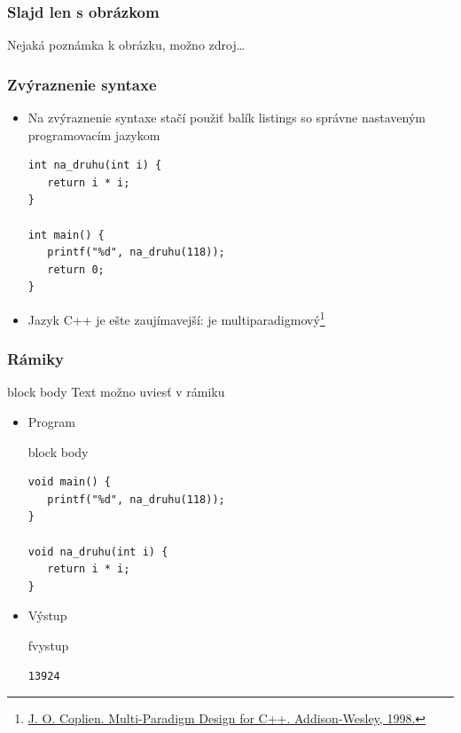 \documentclass{beamer}
\newcommand{\footcite}[1]{\footnote{\tiny #1}}
\newenvironment{program}{\begin{beamercolorbox}[rounded=true,shadow=true]{block body}\vspace{-4mm}}{\vspace{-2mm}\end{beamercolorbox}}
\newenvironment{vystup}{\begin{beamercolorbox}[rounded=true,shadow=true]{fvystup}}{\end{beamercolorbox}}
\newenvironment{poznamka}{\begin{beamercolorbox}[rounded=true,shadow=false]{block body}}{\end{beamercolorbox}}
\begin{document}
\begin{frame}[fragile=singleslide]\frametitle{Slajd len s obrázkom}

	{\tiny Nejaká poznámka k obrázku, možno zdroj\ldots}
\end{frame}


\begin{frame}[fragile=singleslide]\frametitle{Zvýraznenie syntaxe}
	\begin{itemize}
		\item Na zvýraznenie syntaxe stačí použiť balík listings so správne nastaveným programovacím jazykom
		      \begin{lstlisting}
int na_druhu(int i) {
   return i * i;
}

int main() {
   printf("%d", na_druhu(118));
   return 0;
}
\end{lstlisting}

		\item Jazyk C++ je ešte zaujímavejší: je multiparadigmový\footcite{\url{J. O. Coplien. Multi-Paradigm Design for C++. Addison-Wesley, 1998.}}
	\end{itemize}
\end{frame}


\begin{frame}[fragile=singleslide]\frametitle{Rámiky}
	\begin{poznamka}
		Text možno uviesť v rámiku
	\end{poznamka}

	\begin{itemize}
		\item Program

		      \begin{program}
			      \begin{lstlisting}
void main() {
   printf("%d", na_druhu(118));
}

void na_druhu(int i) {
   return i * i;
}
\end{lstlisting}
		      \end{program}

		\item Výstup
		      \begin{vystup}
			      \begin{lstlisting}
13924
\end{lstlisting}
		      \end{vystup}

	\end{itemize}
\end{frame}
\end{document}
